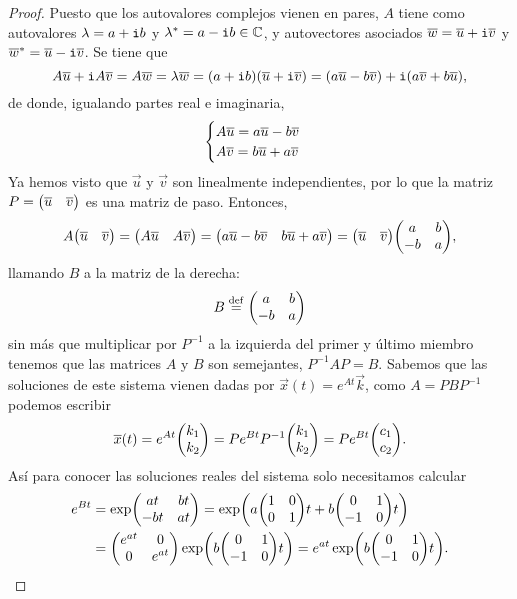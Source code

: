 \documentclass[../ecuaciones_diferenciales.tex]{subfiles}
\begin{document}
\begin{proof}
	Puesto que los autovalores complejos vienen en pares, \(A\) tiene como
	autovalores \(\lambda = a + \mathtt{i} b\) y 
	\({\lambda}^\ast = a - \mathtt{i} b \in \mathbb{C}\), 
	y autovectores asociados 
	\(\overline{w} = \overline{u} + \mathtt{i}\overline{v}\) y 
	\({\overline{w}}^\ast = \overline{u} - \mathtt{i}\overline{v}\). Se tiene que
	\[A\overline{u} + \mathtt{i} A\overline{v} 
		= A\overline{w} = \lambda \overline{w} 
		= (a + \mathtt{i} b)(\overline{u} + \mathtt{i} \overline{v}) 
		= (a\overline{u} - b\overline{v}) + \mathtt{i}(a\overline{v} + b\overline{u}),\]
	de donde, igualando partes real e imaginaria,
	\[\begin{cases}
		A\overline{u} = a\overline{u} - b\overline{v} \\
		A\overline{v} = b\overline{u} + a\overline{v}\end{cases}\]
	Ya hemos visto que \(\vec{u}\) y \(\vec{v}\) son linealmente independientes,
	por lo que la matriz \(P = \begin{pmatrix}\overline{u} & \overline{v}\end{pmatrix}\) 
	es una matriz de paso. Entonces,
	\[A \mat{\vec{u} & \vec{v}} 
		= \mat{A\vec{u} & A\vec{v}} 
		= \mat{a\vec{u} - b\vec{v} & b\vec{u} + a\vec{v}} 
		= \mat{\vec{u} & \vec{v}} \mat{a & b \\ -b & a},\]
	llamando \(B\) a la matriz de la derecha:
	\[B \overset{\operatorname{def}}{=} \begin{pmatrix}a & b \\ -b & a\end{pmatrix}\]
	sin más que multiplicar por \(P^{-1}\) a la izquierda del primer y último
	miembro tenemos que las matrices \(A\) y \(B\) son semejantes, 
	\(P^{-1}AP = B\). 
	Sabemos que las soluciones de este sistema vienen dadas por 
	\(\vec{x}(t) = e^{At} \vec{k}\), como \(A = PBP^{-1}\) podemos escribir 
	\[\vec{x}(t) = e^{At} \mat{k_1 \\ k_2} 
		= P e^{Bt} P^{-1} \mat{k_1 \\ k_2} 
		= P e^{Bt} \mat{c_1 \\ c_2}.\]
	Así para conocer las soluciones reales del sistema solo necesitamos calcular
	\begin{align*}
		e^{Bt} &= \exp\mat{at & bt \\ -bt & at} 
			= \exp\parens{a\mat{1 & 0 \\ 0 & 1}t + b\mat{0 & 1 \\ -1 & 0}t} \\
			&= \mat{e^{at}  & 0 \\ 0 & e^{at}} 
			\exp\left(b\mat{0 & 1 \\ -1 & 0}t\right) 
			= e^{at}\exp\left(b\mat{0 & 1 \\ -1 & 0}t\right).
	\end{align*}
	

\end{proof}
\end{document}
